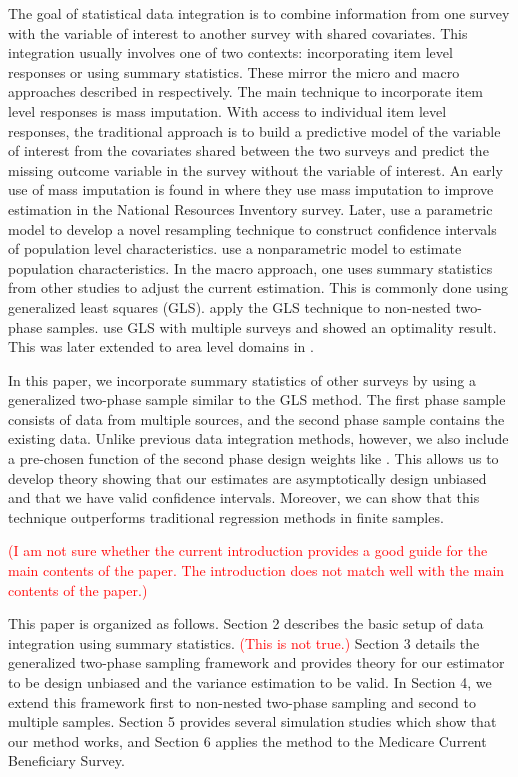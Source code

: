 \documentclass[12pt]{article}
\begin{document}
The goal of statistical data integration is to combine information from one
survey with the variable of interest to another survey with
shared covariates. 
This integration usually involves one of two contexts: incorporating item
level responses or using summary statistics. These mirror the micro and macro
approaches described in \cite{yang2020statistical} respectively. The main
technique to incorporate item level responses is mass imputation. With access to
individual item level responses, the traditional approach is to build a
predictive model of the variable of interest from the covariates shared between
the two surveys and predict the missing outcome variable in the survey without
the variable of interest. An early use of mass imputation is found in
\cite{breidt1996two} where they use mass imputation to improve estimation in
the National Resources Inventory survey. Later, \cite{kim2012combining} use a
parametric model to develop a novel resampling technique to construct confidence
intervals of population level characteristics. \cite{chen2022nonparametric} use
a nonparametric model to estimate population characteristics. In the macro
approach, one uses summary statistics from other studies to adjust the current
estimation. This is commonly done using generalized least squares (GLS).
\cite{hidiroglou2001double} apply the GLS technique to non-nested two-phase
samples. \cite{merkouris2004combining} use GLS with multiple surveys and showed
an optimality result. This was later extended to area level domains in
\cite{merkouris2010combining}.

In this paper, we incorporate summary statistics of other surveys by
using a generalized two-phase sample similar to the GLS method. The first phase
sample consists of data
from multiple sources, and the second phase sample contains the existing
data. Unlike previous data integration methods, however, we also include a
pre-chosen function of the second phase design weights like
\cite{kwon2024debiased}. This allows us to develop theory showing that our
estimates are asymptotically design unbiased and that we have valid confidence
intervals. Moreover, we can show that this technique outperforms traditional
regression methods in finite samples.

\textcolor{red}{(I am not sure whether the current introduction provides a good guide for the main contents of the paper. The introduction does not match  well with the main contents of the paper.)
}

This paper is organized as follows. Section 2 describes the basic setup of data
integration using summary statistics. \textcolor{red}{(This is not true.)} Section 3 details the generalized
two-phase sampling framework and provides theory for our estimator to be design
unbiased and the variance estimation to be valid. In Section 4, we extend this
framework first to non-nested two-phase sampling and second to multiple
samples. Section 5 provides several simulation studies which show that our
method works, and Section 6 applies the method to the Medicare Current
Beneficiary Survey. 
\end{document}
